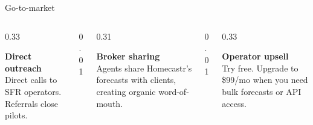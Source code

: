 \documentclass[aspectratio=169,12pt]{beamer}
\newcommand{\goldtext}[1]{{\color{hcGold}#1}}
\begin{document}
\begin{frame}{Go-to-market}
\vspace{16pt}

\begin{columns}[T, totalwidth=\textwidth]
\begin{column}{0.33\textwidth}
\begin{center}
{\goldtext{\textbf{Direct outreach}}}\\[8pt]
{\small\color{hcMuted} Direct calls to SFR operators. Referrals close pilots.}
\end{center}
\end{column}
\begin{column}{0.01\textwidth}
\end{column}
\begin{column}{0.31\textwidth}
\begin{center}
{\goldtext{\textbf{Broker sharing}}}\\[8pt]
{\small\color{hcMuted} Agents share Homecastr's forecasts with clients, creating organic word-of-mouth.}
\end{center}
\end{column}
\begin{column}{0.01\textwidth}
\end{column}
\begin{column}{0.33\textwidth}
\begin{center}
{\goldtext{\textbf{Operator upsell}}}\\[8pt]
{\small\color{hcMuted} Try free. Upgrade to \$99/mo when you need bulk forecasts or API access.}
\end{center}
\end{column}
\end{columns}

\end{frame}
\end{document}
